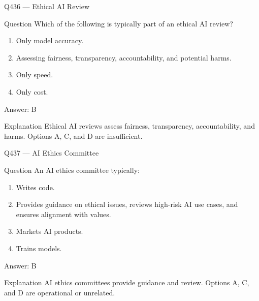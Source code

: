 \documentclass[aspectratio=169,8pt]{beamer}
\begin{document}
	\begin{frame}{Q436 --- Ethical AI Review}
		\begin{block}{Question}
			Which of the following is typically part of an ethical AI review?
			\begin{enumerate}
				\item Only model accuracy.
				\item Assessing fairness, transparency, accountability, and potential harms.
				\item Only speed.
				\item Only cost.
			\end{enumerate}
		\end{block}
		\begin{exampleblock}{Answer: B}\end{exampleblock}
		\begin{block}{Explanation}
			Ethical AI reviews assess fairness, transparency, accountability, and harms. Options A, C, and D are insufficient.
		\end{block}
	\end{frame}
	
	\begin{frame}{Q437 --- AI Ethics Committee}
		\begin{block}{Question}
			An AI ethics committee typically:
			\begin{enumerate}
				\item Writes code.
				\item Provides guidance on ethical issues, reviews high-risk AI use cases, and ensures alignment with values.
				\item Markets AI products.
				\item Trains models.
			\end{enumerate}
		\end{block}
		\begin{exampleblock}{Answer: B}\end{exampleblock}
		\begin{block}{Explanation}
			AI ethics committees provide guidance and review. Options A, C, and D are operational or unrelated.
		\end{block}
	\end{frame}
	
\end{document}

